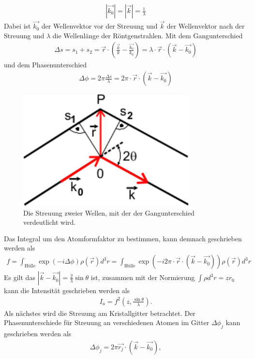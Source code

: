 \begin{align}
	|\vec{k_0}|=|\vec{k}|=\frac{1}{\lambda}
\end{align}
Dabei ist $\vec{k_0}$ der Wellenvektor vor der Streuung und $\vec{k}$ der Wellenvektor nach der Streuung und $\lambda$ die Wellenlänge der Röntgenstrahlen.
Mit dem Gangunterschied
\begin{align}
	\Delta s = s_1 + s_2= \vec{r}\cdot\left( \frac{\vec{k}}{k}-\frac{\vec{k_0}}{k_0}\right)=\lambda\cdot\vec{r}\cdot\left(\vec{k}-\vec{k_0}\right)
\end{align}
und dem Phasenunterschied
\begin{align}
	\Delta \phi = 2\pi \frac{\Delta s}{\lambda}=2\pi\cdot\vec{r}\cdot\left(\vec{k}-\vec{k_0}\right)
\end{align}
\begin{figure}
	\centering
	\includegraphics[scale = 1]{../Grafiken/StreuungUnterschied.pdf}
	\caption{Die Streuung zweier Wellen, mit der der Gangunterschied verdeutlicht wird.}\label{fig:Gangunterschied}
\end{figure}
Das Integral um den Atomformfaktor zu bestimmen, kann demnach geschrieben werden als
\begin{align}
	f=\int_{\text{Hülle}}\exp(-i\Delta \phi)\rho(\vec{r})d^3r=\int_{\text{Hülle}}\exp(-i2\pi\cdot\vec{r}\cdot\left(\vec{k}-\vec{k_0}\right))\rho(\vec{r})d^3r
\end{align}
Es gilt das $|\vec{k}-\vec{k_0}| =\frac{2}{\lambda}\sin\theta$ ist, zusammen mit der Normierung $\int \rho d^3r = zr_0$ kann die Intensität geschrieben werden als
\begin{align}
	I_a=f^2\left(z, \frac{\sin\theta}{\lambda} \right).
\end{align}
Als nächstes wird die Streuung am Kristallgitter betrachtet. Der Phasenunterschiede für Streuung an verschiedenen Atomen im Gitter $\Delta \phi_j$ kann geschrieben werden als 
\begin{align}
	\Delta \phi_j = 2\pi \vec{r_j}\cdot\left(\vec{k}-\vec{k_0}\right),
\end{align}
